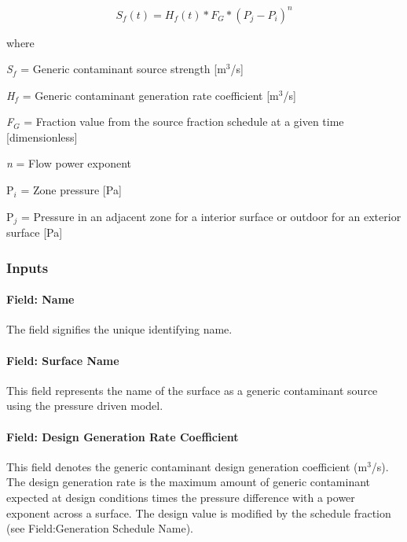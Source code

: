 \begin{equation}
{S_f}(t) = {H_f}(t)*{F_G}*{\left( {{P_j} - {P_i}} \right)^n}
\end{equation}

where

\emph{S\(_{f}\)} = Generic contaminant source strength {[}m\(^{3}\)/s{]}

\emph{H\(_{f}\)} = Generic contaminant generation rate coefficient {[}m\(^{3}\)/s{]}

\emph{F\(_{G}\)} = Fraction value from the source fraction schedule at a given time {[}dimensionless{]}

\emph{n} = Flow power exponent

P\emph{\(_{i}\)} = Zone pressure {[}Pa{]}

P\emph{\(_{j}\)} = Pressure in an adjacent zone for a interior surface or outdoor for an exterior surface {[}Pa{]}

\subsubsection{Inputs}\label{inputs-12-007}

\paragraph{Field: Name}\label{field-name-12-005}

The field signifies the unique identifying name.

\paragraph{Field: Surface Name}\label{field-surface-name-2-000}

This field represents the name of the surface as a generic contaminant source using the pressure driven model.

\paragraph{Field: Design Generation Rate Coefficient}\label{field-design-generation-rate-coefficient}

This field denotes the generic contaminant design generation coefficient (m\(^{3}\)/s). The design generation rate is the maximum amount of generic contaminant expected at design conditions times the pressure difference with a power exponent across a surface. The design value is modified by the schedule fraction (see Field:Generation Schedule Name).

